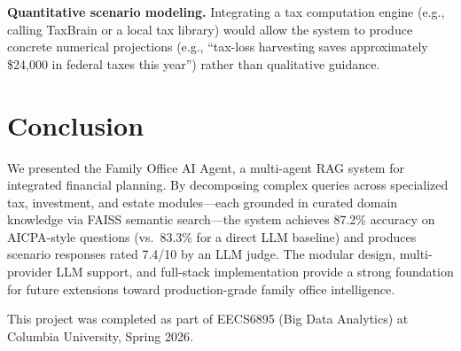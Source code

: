 \documentclass[sigplan,screen]{acmart}
\begin{document}
\textbf{Quantitative scenario modeling.}
Integrating a tax computation engine (e.g., calling TaxBrain or a local tax library) would allow the system to produce concrete numerical projections (e.g., ``tax-loss harvesting saves approximately \$24,000 in federal taxes this year'') rather than qualitative guidance.

\section{Conclusion}

We presented the Family Office AI Agent, a multi-agent RAG system for integrated financial planning.
By decomposing complex queries across specialized tax, investment, and estate modules---each grounded in curated domain knowledge via FAISS semantic search---the system achieves 87.2\% accuracy on AICPA-style questions (vs.\ 83.3\% for a direct LLM baseline) and produces scenario responses rated 7.4/10 by an LLM judge.
The modular design, multi-provider LLM support, and full-stack implementation provide a strong foundation for future extensions toward production-grade family office intelligence.

\begin{acks}
This project was completed as part of EECS6895 (Big Data Analytics) at Columbia University, Spring 2026.
\end{acks}



\end{document}
